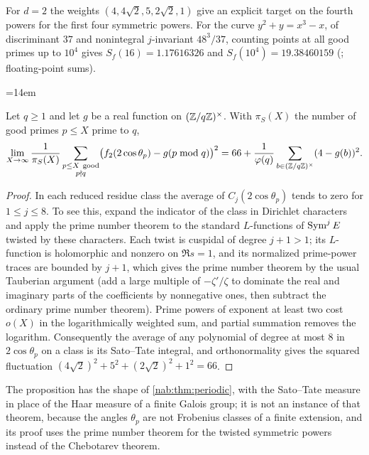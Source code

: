 For $d=2$ the weights $(4,4\sqrt2,5,2\sqrt2,1)$ give an explicit target on the fourth powers for the first
four symmetric powers. For the curve $y^2+y=x^3-x$, of discriminant $37$ and nonintegral $j$-invariant
$48^3/37$, counting points at all good primes up to $10^4$ gives $S_f(16)=1.17616326$ and
$S_f(10^4)=19.38460159$ (; floating-point sums).
{\emergencystretch=14em\par}

\begin{proposition}\label{hec:prop:66}
Let $q\ge1$ and let $g$ be a real function on $(\mathbb{Z}/q\mathbb{Z})^\times$. With $\pi_S(X)$ the number of good primes
$p\le X$ prime to $q$,
\[
 \lim_{X\to\infty}\frac1{\pi_S(X)}\sum_{\substack{p\le X\ \mathrm{good}\\p\nmid q}}
 \bigl(f_2(2\cos\theta_p)-g(p\bmod q)\bigr)^2
 =66+\frac1{\varphi(q)}\sum_{b\in(\mathbb{Z}/q\mathbb{Z})^\times}(4-g(b))^2 .
\]
\end{proposition}

\begin{proof}
In each reduced residue class the average of $C_j(2\cos\theta_p)$ tends to zero for $1\le j\le8$. To see
this, expand the indicator of the class in Dirichlet characters and apply the prime number theorem to the
standard $L$-functions of $\operatorname{Sym}^jE$ twisted by these characters. Each twist is cuspidal of degree
$j+1>1$; its $L$-function is holomorphic and nonzero on $\Re s=1$, and its normalized prime-power traces
are bounded by $j+1$, which gives the prime number theorem by the usual Tauberian argument (add a large
multiple of $-\zeta'/\zeta$ to dominate the real and imaginary parts of the coefficients by nonnegative
ones, then subtract the ordinary prime number theorem). Prime powers of exponent at least two cost $o(X)$
in the logarithmically weighted sum, and partial summation removes the logarithm. Consequently the average
of any polynomial of degree at most $8$ in $2\cos\theta_p$ on a class is its Sato--Tate integral, and
orthonormality gives the squared fluctuation $(4\sqrt2)^2+5^2+(2\sqrt2)^2+1^2=66$.
\end{proof}

The proposition has the shape of \cref{nab:thm:periodic}, with the Sato--Tate measure in place of the Haar
measure of a finite Galois group; it is not an instance of that theorem, because the angles $\theta_p$ are
not Frobenius classes of a finite extension, and its proof uses the prime number theorem for the twisted
symmetric powers instead of the Chebotarev theorem.

